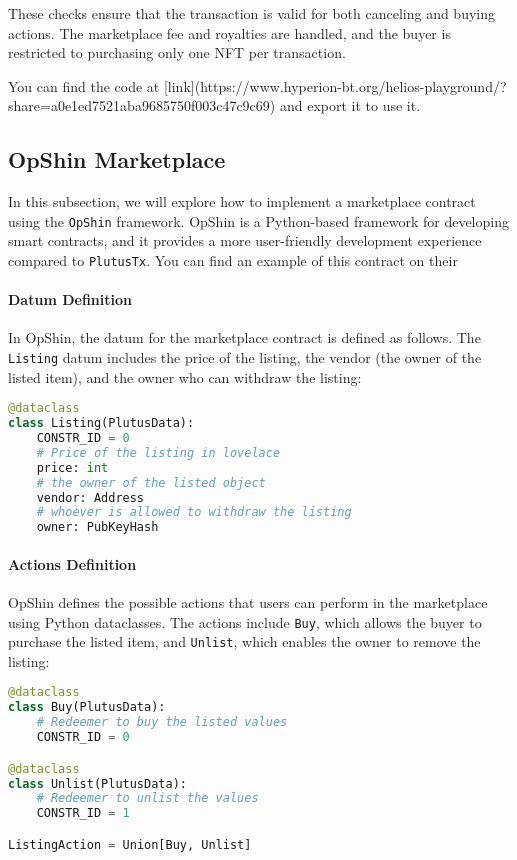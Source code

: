 These checks ensure that the transaction is valid for both canceling and buying actions. The marketplace fee and royalties are handled, and the buyer is restricted to purchasing only one NFT per transaction.

You can find the code at [link](https://www.hyperion-bt.org/helios-playground/?share=a0e1ed7521aba9685750f003c47c9c69) and export it to use it.

\subsection{OpShin Marketplace}

In this subsection, we will explore how to implement a marketplace contract using the \texttt{OpShin} framework. OpShin is a Python-based framework for developing smart contracts, and it provides a more user-friendly development experience compared to \texttt{PlutusTx}. You can find an example of this contract on their
\paragraph{Datum Definition}
In OpShin, the datum for the marketplace contract is defined as follows. The \texttt{Listing} datum includes the price of the listing, the vendor (the owner of the listed item), and the owner who can withdraw the listing:

\begin{lstlisting}[language=python, caption=Datum Definition in OpShin]
@dataclass
class Listing(PlutusData):
    CONSTR_ID = 0
    # Price of the listing in lovelace
    price: int
    # the owner of the listed object
    vendor: Address
    # whoever is allowed to withdraw the listing
    owner: PubKeyHash
\end{lstlisting}

\paragraph{Actions Definition}
OpShin defines the possible actions that users can perform in the marketplace using Python dataclasses. The actions include \texttt{Buy}, which allows the buyer to purchase the listed item, and \texttt{Unlist}, which enables the owner to remove the listing:

\begin{lstlisting}[language=python, caption=Actions Definition in OpShin]
@dataclass
class Buy(PlutusData):
    # Redeemer to buy the listed values
    CONSTR_ID = 0

@dataclass
class Unlist(PlutusData):
    # Redeemer to unlist the values
    CONSTR_ID = 1

ListingAction = Union[Buy, Unlist]
\end{lstlisting}

